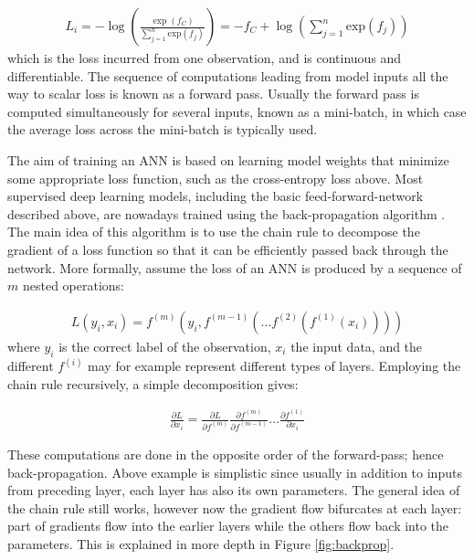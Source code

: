 \documentclass[12pt]{report}
\begin{document}
\begin{align} \label{XEloss}
  L_i  = -\log \left(\frac{\exp (f_C)}{\sum_{j=1}^{n} \text{exp}(f_j)}\right) = -f_C + \log\left(\sum_{j=1}^n \text{exp}(f_j)\right)
\end{align}
which is the loss incurred from one observation, and is continuous and differentiable. The sequence of computations leading from model inputs all the way to scalar loss is known as a forward pass. Usually the forward pass is computed simultaneously for several inputs, known as a mini-batch, in which case the average loss across the mini-batch is typically used. 

The aim of training an ANN is based on learning model weights that minimize some appropriate loss function, such as the cross-entropy loss above. Most supervised deep learning models, including the basic feed-forward-network described above, are nowadays trained using the back-propagation algorithm \cite{Linnainmaa1976} \cite{Rumelhart1985}. The main idea of this algorithm is to use the chain rule to decompose the gradient of a loss function so that it can be efficiently passed back through the network. More formally, assume the loss of an ANN is produced by a sequence of $m$ nested operations:

\begin{align} \label{bp_eq1}
  L(y_i, x_i) = f^{(m)}(y_i, f^{(m-1)}(\dots f^{(2)}(f^{(1)}(x_i))))
\end{align}
where $y_i$ is the correct label of the observation, $x_i$ the input data, and the different $f^{(i)}$ may for example represent different types of layers. Employing the chain rule recursively, a simple decomposition gives:

\begin{align} \label{bp_crule}
  \frac{\partial L}{\partial x_i} = \frac{\partial L}{\partial f^{(m)}}\frac{\partial f^{(m)}}{\partial f^{(m-1)}} \dots \frac{\partial f^{(1)}}{\partial x_i}
\end{align}

These computations are done in the opposite order of the forward-pass; hence back-propagation. Above example is simplistic since usually in addition to inputs from preceding layer, each layer has also its own parameters. The general idea of the chain rule still works, however now the gradient flow bifurcates at each layer: part of gradients flow into the earlier layers while the others flow back into the parameters. This is explained in more depth in Figure \ref{fig:backprop}. 
\end{document}
